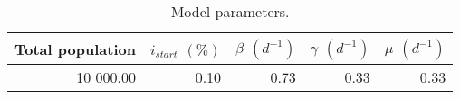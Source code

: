 \begin{table}[h]
\centering
\caption{Model parameters.}
\label{tab:params}
\begin{tabular}{rrrrr}
\toprule
Total population & $i_{start}$ $(\%)$ & $\beta $ $(d^{-1})$ & $\gamma $ $(d^{-1})$ & $\mu$ $(d^{-1})$ \\
\midrule
        10 000.00 &               0.10 &               0.73 &                 0.33 &             0.33 \\
\bottomrule
\end{tabular}
\end{table}
